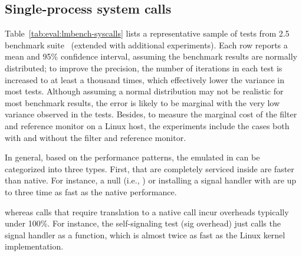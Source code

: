 \subsection{Single-process system calls}
\label{eval:perf:syscalls}


Table~\ref{tab:eval:lmbench-syscalls} lists 
a representative sample of 
tests from \lmbench{} 2.5 benchmark suite~\cite{McVoy:lmbench}
(extended with additional experiments).
Each row reports a mean and 95\% confidence interval,
assuming the benchmark results are normally distributed;
to improve the precision,
the number of iterations in each test is increased to at least a thousand times, which effectively lower the variance
in most tests.
Although assuming a normal distribution may not be realistic for most benchmark results,
the error is likely to be marginal with the very low variance
observed in the tests.
Besides, to measure the marginal cost of the \seccomp{} filter and reference monitor on a Linux host,
the experiments include the cases both with
and without the \seccomp{} filter and reference monitor.


In general, based on the performance patterns,
the \linuxapis{} emulated in \thelibos{} can be categorized into three types.
First, \linuxapis{} that are completely serviced inside \thelibos{} are faster than native.
For instance,
a null \linuxapi{} (i.e., )
or installing a signal handler with 
are up to three time as fast as
the native performance.


whereas calls that require translation to a native call incur overheads typically under 100\%.
For instance, 
the self-signaling test (sig overhead)
just calls the signal handler as a function,
which is almost twice as fast
as the Linux kernel implementation.  

